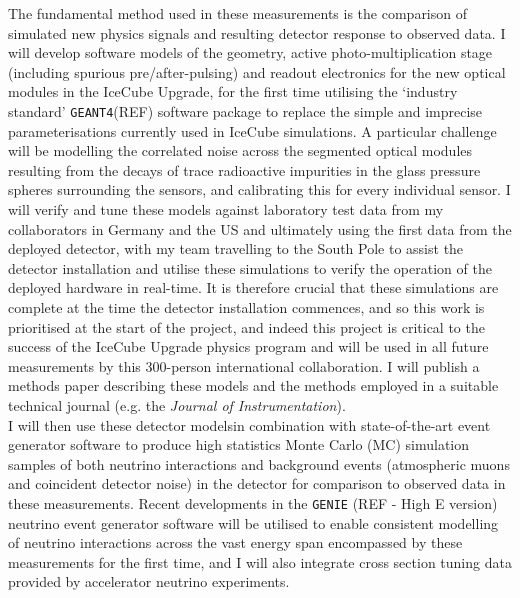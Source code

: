 \documentclass[a4paper,11pt]{article}
\begin{document}
The fundamental method used in these measurements is the comparison of simulated new physics signals and resulting detector response to observed data. I will develop software models of the geometry, active photo-multiplication stage (including spurious pre/after-pulsing) and readout electronics for the new optical modules in the IceCube Upgrade, for the first time utilising the `industry standard' \texttt{GEANT4}(REF) software package to replace the simple and imprecise parameterisations currently used in IceCube simulations. A particular challenge will be modelling the correlated noise across the segmented optical modules resulting from the decays of trace radioactive impurities in the glass pressure spheres surrounding the sensors, and calibrating this for every individual sensor. I will verify and tune these models against laboratory test data from my collaborators in Germany and the US and ultimately using the first data from the deployed detector, with my team travelling to the South Pole to assist the detector installation and utilise these simulations to verify the operation of the deployed hardware in real-time. It is therefore crucial that these simulations are complete at the time the detector installation commences, and so this work is prioritised at the start of the project, and indeed this project is critical to the success of the IceCube Upgrade physics program and will be used in all future measurements by this 300-person international collaboration. I will publish a methods paper describing these models and the methods employed in a suitable technical journal (e.g. the \textit{Journal of Instrumentation}). \\

I will then use these detector modelsin combination with state-of-the-art event generator software to produce high statistics Monte Carlo (MC) simulation samples of both neutrino interactions and background events (atmospheric muons and coincident detector noise) in the detector for comparison to observed data in these measurements. Recent developments in the \texttt{GENIE} (REF - High E version) neutrino event generator software will be utilised to enable consistent modelling of neutrino interactions across the vast energy span encompassed by these measurements for the first time, and I will also integrate cross section tuning data provided by accelerator neutrino experiments. 
\end{document}
